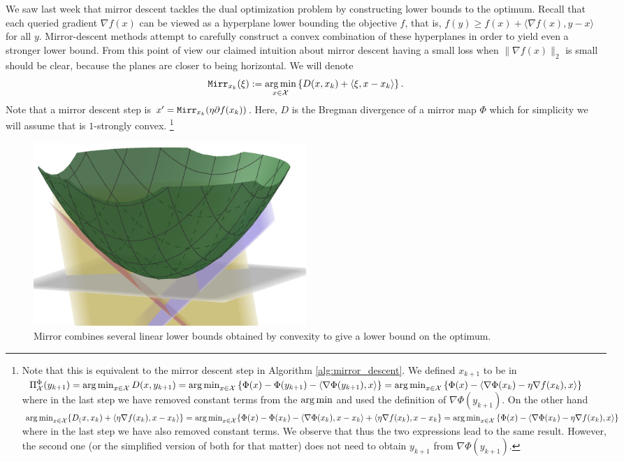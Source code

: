 We saw last week that mirror descent tackles the dual optimization problem by constructing lower bounds to the optimum. Recall that each queried gradient $\nabla f(x)$ can be viewed as a hyperplane lower bounding the objective $f$, that is, $f (y) \geq f (x)+ \langle \nabla f (x), y-x \rangle$ for all $y$. Mirror-descent methods attempt to carefully construct a convex combination of these hyperplanes in order to yield even a stronger lower bound. From this point of view our claimed intuition about mirror descent having a small loss when $\|\nabla f(x)\|_2$ is small should be clear, because the planes are closer to being horizontal. We will denote
\[
    {\tt{Mirr}}_{x_k}(\xi):= \operatorname*{arg\,min}_{x \in \mathcal{X}} \left\{ D(x, x_k) + \langle \xi, x-x_k \rangle \right\}. 
\]
Note that a mirror descent step is $x' = {\tt{Mirr}}_{x_k}(\eta \partial f(x_k))$. Here, $D$ is the Bregman divergence of a mirror map $\Phi$ which for simplicity we will assume that is $1$-strongly convex.  \footnote{Note that this is equivalent to the mirror descent step in Algorithm \ref{alg:mirror_descent}. We defined $x_{k+1}$ to be in $ \Pi_\mathcal{X}^\Phi(y_{k+1}) = \operatorname*{arg\,min}_{x\in\mathcal{X}}D(x, y_{k+1}) = \operatorname*{arg\,min}_{x\in\mathcal{X}}\left\{ \Phi(x) - \Phi(y_{k+1}) - \langle \nabla \Phi(y_{k+1}), x\rangle \right\} = \operatorname*{arg\,min}_{x\in\mathcal{X}}\left\{ \Phi(x) - \langle \nabla \Phi(x_k) - \eta \nabla f(x_k), x\rangle \right\}$ where in the last step we have removed constant terms from the $\operatorname*{arg\,min}$ and used the definition of $\nabla \Phi(y_{k+1})$. On the other hand $\operatorname*{arg\,min}_{x\in\mathcal{X}}\{D_(x, x_k) + \langle \eta \nabla f(x_k), x-x_k \rangle\} = \operatorname*{arg\,min}_{x\in\mathcal{X}}\{\Phi(x)  - \Phi(x_k) - \langle \nabla \Phi(x_k), x-x_k\rangle + \langle \eta \nabla f(x_k), x- x_k \}  = \operatorname*{arg\,min}_{x\in\mathcal{X}}\left\{ \Phi(x) - \langle \nabla \Phi(x_k) - \eta \nabla f(x_k), x\rangle \right\}$ where in the last step we have also removed constant terms. We observe that thus the two expressions lead to the same result. However, the second one (or the simplified version of both for that matter) does not need to obtain $y_{k+1}$ from $\nabla \Phi(y_{k+1})$.}

\begin{figure}[h!] \label{mirror_descent_dual_loss}
\centering
        \includegraphics[width=0.5\textwidth]{img/mirror_descent_dual_loss} 
        \caption{Mirror combines several linear lower bounds obtained by convexity to give a lower bound on the optimum.}
\end{figure}


